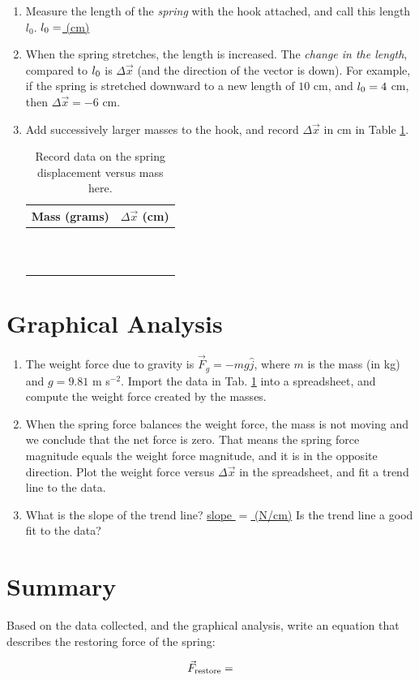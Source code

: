 \documentclass{article}
\begin{document}
\begin{enumerate}
\item Measure the length of the \textit{spring} with the hook attached, and call this length $l_{0}$.  \underline{$l_{\rm 0}=$ \hspace{1cm} (cm)}
\item When the spring stretches, the length is increased.  The \textit{change in the length}, compared to $l_{\rm 0}$ is $\Delta \vec{x}$ (and the direction of the vector is down).  For example, if the spring is stretched downward to a new length of $10$ cm, and $l_{\rm 0} = 4$ cm, then $\Delta \vec{x} = -6$ cm.
\item Add successively larger masses to the hook, and record $\Delta \vec{x}$ in cm in Table \ref{tab:data}.
\begin{table}
\centering
\begin{tabular}{| c | c |}
\hline
Mass (grams) & $\Delta \vec{x}$ (cm) \\ \hline
 &  \\ \hline
 &  \\ \hline
 &  \\ \hline
 &  \\ \hline
 &  \\ \hline
 &  \\ \hline
 &  \\ \hline
 &  \\ \hline
 &  \\ \hline
 &  \\ \hline
 &  \\ \hline
\end{tabular}
\caption{\label{tab:data} Record data on the spring displacement versus mass here.}
\end{table}
\end{enumerate}

\section{Graphical Analysis}

\begin{enumerate}
\item The weight force due to gravity is $\vec{F}_g = -mg \hat{j}$, where $m$ is the mass (in kg) and $g = 9.81$ m s$^{-2}$.  Import the data in Tab. \ref{tab:data} into a spreadsheet, and compute the weight force created by the masses.
\item When the spring force balances the weight force, the mass is not moving and we conclude that the net force is zero.  That means the spring force magnitude equals the weight force magnitude, and it is in the opposite direction.  Plot the weight force versus $\Delta \vec{x}$ in the spreadsheet, and fit a trend line to the data.
\item What is the slope of the trend line? \underline{slope $=$ \hspace{1cm} (N/cm)} Is the trend line a good fit to the data?
\end{enumerate}

\section{Summary}

Based on the data collected, and the graphical analysis, write an equation that describes the restoring force of the spring:

\begin{equation}
\vec{F}_{\rm restore} = 
\end{equation}
\end{document}
